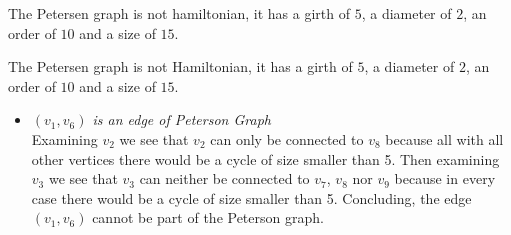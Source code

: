 \documentclass[a4paper]{article}
\begin{document}
\begin{solution}{9}
\begin{theorem}{The Petersen graph is not hamiltonian, it has a girth of $5$, a diameter of $2$, an order of $10$ and a size of $15$.}
\begin{theorem}{The Petersen graph is not Hamiltonian, it has a girth of $5$, a diameter of $2$, an order of $10$ and a size of $15$.}
\begin{itemize}
					In all three cases a cycle is created with size smaller than 5. 
					($v_1,v_5,v_4,v_{10},v_1$ with edge $(v_{10},v_4)$,  $v_1,v_5,v_{10},v_1$ with edge $(v_{10},v_5)$ or $v_1,v_5,v_6,v_{10},v_1$ with edge $(v_{10},v_6)$ )
					Concluding, the edge $(v_1,v_5)$ cannot be part of the Peterson graph. 
					\begin{center}
					\end{center}
				\item \emph{$(v_1,v_6)$ is an edge of Peterson Graph}\\
					Examining $v_2$ we see that $v_2$ can only be connected to $v_8$ because all with all other vertices there would be a cycle of size smaller than 5. 
					Then examining $v_3$ we see that $v_3$ can neither be connected to $v_7$, $v_8$ nor $v_9$ because in every case there would be a cycle of size smaller than 5. 
					Concluding, the edge $(v_1,v_6)$ cannot be part of the Peterson graph. 
					\begin{center}
\end{center}
\end{itemize}
\end{theorem}
\end{theorem}
\end{solution}
\end{document}
